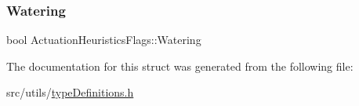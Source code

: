 \subsubsection{\texorpdfstring{Watering}{Watering}}
{\footnotesize\ttfamily bool Actuation\+Heuristics\+Flags\+::\+Watering}



The documentation for this struct was generated from the following file\+:\begin{DoxyCompactItemize}
\item 
src/utils/\hyperlink{typeDefinitions_8h}{type\+Definitions.\+h}\end{DoxyCompactItemize}
